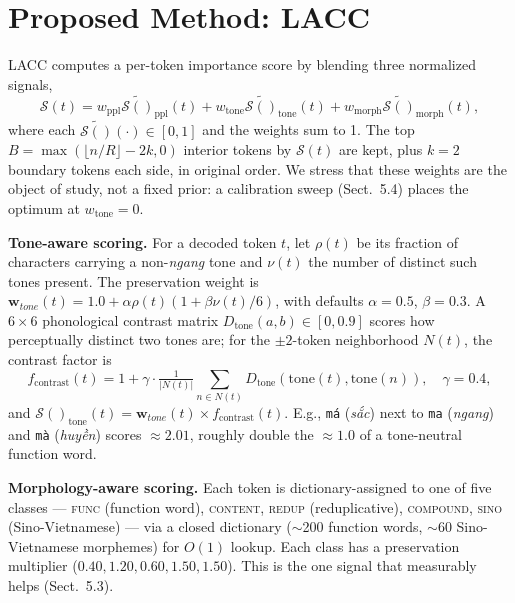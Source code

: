 \documentclass[runningheads]{llncs}
\newcommand{\tone}[1]{\textit{#1}}
\newcommand{\score}[1]{\mathcal{S}(#1)}
\newcommand{\weight}[1]{\mathbf{w}_{#1}}
\newcommand{\token}[1]{\texttt{#1}}
\newcommand{\method}[1]{\textsc{#1}}
\begin{document}
\section{Proposed Method: LACC}

\method{LACC} computes a per-token importance score by blending three normalized signals,
\begin{equation}
\score{t} = w_{\text{ppl}} \tilde{\score{}}_{\text{ppl}}(t) + w_{\text{tone}} \tilde{\score{}}_{\text{tone}}(t) + w_{\text{morph}} \tilde{\score{}}_{\text{morph}}(t),
\label{eq:combined}
\end{equation}
where each $\tilde{\score{}}(\cdot)\!\in\![0,1]$ and the weights sum to 1. The top $B=\max(\lfloor n/R\rfloor-2k,0)$ interior tokens by $\score{t}$ are kept, plus $k{=}2$ boundary tokens each side, in original order. We stress that these weights are the object of study, not a fixed prior: a calibration sweep (Sect.~5.4) places the optimum at $w_{\text{tone}}{=}0$.

\textbf{Tone-aware scoring.} For a decoded token $t$, let $\rho(t)$ be its fraction of characters carrying a non-\tone{ngang} tone and $\nu(t)$ the number of distinct such tones present. The preservation weight is $\weight{tone}(t) = 1.0+\alpha\rho(t)(1+\beta\nu(t)/6)$, with defaults $\alpha{=}0.5$, $\beta{=}0.3$. A $6\times6$ phonological contrast matrix $D_{\text{tone}}(a,b)\in[0,0.9]$ scores how perceptually distinct two tones are; for the $\pm2$-token neighborhood $N(t)$, the contrast factor is
\begin{equation}
f_{\text{contrast}}(t) = 1+\gamma\cdot\tfrac{1}{|N(t)|}\textstyle\sum_{n\in N(t)} D_{\text{tone}}(\text{tone}(t),\text{tone}(n)), \quad \gamma{=}0.4,
\end{equation}
and $\score{}_{\text{tone}}(t)=\weight{tone}(t)\times f_{\text{contrast}}(t)$. E.g., \token{má} (\tone{sắc}) next to \token{ma} (\tone{ngang}) and \token{mà} (\tone{huyền}) scores $\approx2.01$, roughly double the $\approx1.0$ of a tone-neutral function word.

\textbf{Morphology-aware scoring.} Each token is dictionary-assigned to one of five classes --- \textsc{func} (function word), \textsc{content}, \textsc{redup} (reduplicative), \textsc{compound}, \textsc{sino} (Sino-Vietnamese) --- via a closed dictionary ($\sim$200 function words, $\sim$60 Sino-Vietnamese morphemes) for $O(1)$ lookup. Each class has a preservation multiplier ($0.40,1.20,0.60,1.50,1.50$). This is the one signal that measurably helps (Sect.~5.3).
\end{document}
